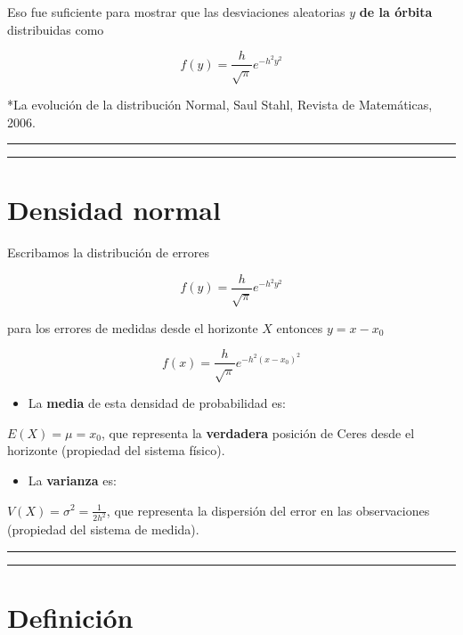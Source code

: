 \documentclass[
]{book}
\providecommand{\tightlist}{%
  \setlength{\itemsep}{0pt}\setlength{\parskip}{0pt}}
\begin{document}
Eso fue suficiente para mostrar que las desviaciones aleatorias \(y\) \textbf{de la órbita} distribuidas como

\[f(y)=\frac{h}{\sqrt{\pi}}e^{-h^2y^2}\]

*La evolución de la distribución Normal, Saul Stahl, Revista de Matemáticas, 2006.

\begin{center}\rule{0.5\linewidth}{0.5pt}\end{center}

\begin{center}\rule{0.5\linewidth}{0.5pt}\end{center}

\hypertarget{densidad-normal-4}{%
\section{Densidad normal}\label{densidad-normal-4}}

Escribamos la distribución de errores

\[f(y)=\frac{h}{\sqrt{\pi}}e^{-h^2y^2}\]

para los errores de medidas desde el horizonte \(X\) entonces \(y=x-x_0\)

\[f(x)=\frac{h}{\sqrt{\pi}}e^{-h^2(x-x_0)^2}\]

\begin{itemize}
\tightlist
\item
  La \textbf{media} de esta densidad de probabilidad es:
\end{itemize}

\(E(X)=\mu=x_0\), que representa la \textbf{verdadera} posición de Ceres desde el horizonte (propiedad del sistema físico).

\begin{itemize}
\tightlist
\item
  La \textbf{varianza} es:
\end{itemize}

\(V(X)=\sigma^2=\frac{1}{2h^2}\), que representa la dispersión del error en las observaciones (propiedad del sistema de medida).

\begin{center}\rule{0.5\linewidth}{0.5pt}\end{center}

\begin{center}\rule{0.5\linewidth}{0.5pt}\end{center}

\hypertarget{definiciuxf3n}{%
\section{Definición}\label{definiciuxf3n}}
\end{document}
